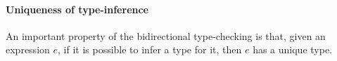 %
%
%
%
%
%




\paragraph{Uniqueness of type-inference}
An important property of the bidirectional type-checking is that, given an expression $e$, if
it is possible to infer a type for it, then $e$ has a unique type.

